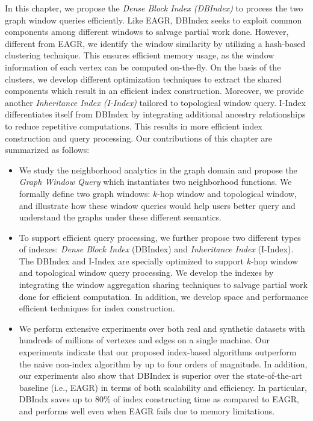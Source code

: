 In this chapter,
we propose the \emph{Dense Block Index (DBIndex)} 
to process the two graph window queries efficiently.
Like EAGR, DBIndex seeks to exploit common
components among different windows to salvage 
partial work done. However, different from EAGR,
we identify the window similarity by utilizing a hash-based 
clustering technique. This ensures 
efficient memory usage, as the window information of each vertex can 
be computed on-the-fly. On the basis of the clusters, we develop different 
optimization techniques to extract the shared components
which result in an efficient index construction. 
%
Moreover, we provide another \emph{Inheritance Index (I-Index)} tailored 
to topological window query. I-Index differentiates itself from
DBIndex by integrating additional ancestry relationships 
to reduce repetitive computations. This results in 
more efficient index construction and query processing.  
%
Our contributions of this chapter are summarized as follows:
\begin{itemize}
\item{We study the neighborhood analytics in the graph domain and propose the
\emph{Graph Window Query} which instantiates two neighborhood functions.
We formally define two graph windows: $k$-hop window and topological window, 
and illustrate how these window queries would help users better query and
understand the graphs under these different semantics.}

\item{To support efficient query processing, we further propose two different types of indexes: \emph{Dense Block Index} (DBIndex) and \emph{Inheritance Index} (I-Index). The
DBIndex and I-Index are specially 
optimized to support $k$-hop window and topological window query processing. 
We develop the indexes by integrating the window aggregation sharing techniques to salvage partial work done for efficient computation. In addition, we develop space and performance efficient techniques for index construction. 
}

\item{We perform extensive experiments over both real and synthetic datasets
with hundreds of millions of vertexes and edges on a single machine. Our experiments 
indicate that our proposed index-based algorithms outperform the naive non-index
algorithm by up to four orders of magnitude. In addition, our experiments also show 
that DBIndex is superior over the state-of-the-art baseline (i.e., EAGR)
in terms of both scalability and efficiency. 
In particular, DBIndx saves up to 80\% of index constructing time as compared to EAGR, 
and performs well even when EAGR fails due to memory limitations. 
}
\end{itemize}


